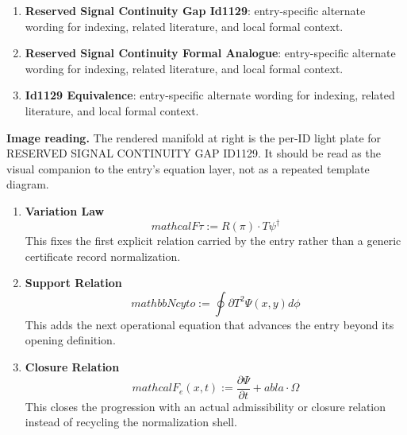 \begin{enumerate}[leftmargin=1.6em,itemsep=6pt,topsep=4pt]
\item \textbf{Reserved Signal Continuity Gap Id1129}: entry-specific alternate wording for indexing, related literature, and local formal context.
\item \textbf{Reserved Signal Continuity Formal Analogue}: entry-specific alternate wording for indexing, related literature, and local formal context.
\item \textbf{Id1129 Equivalence}: entry-specific alternate wording for indexing, related literature, and local formal context.
\end{enumerate}

\begin{samepage}
\noindent\begin{minipage}[t]{0.45\linewidth}
\vspace{0pt}
\raggedright
\scriptsize\textbf{Image reading.} The rendered manifold at right is the per-ID light plate for RESERVED SIGNAL CONTINUITY GAP ID1129. It should be read as the visual companion to the entry's equation layer, not as a repeated template diagram.\par
\end{minipage}\hfill
\begin{minipage}[t]{0.53\linewidth}
\vspace*{-0.10in}
\raggedright
{}
\end{minipage}
\end{samepage}

\clearpage


\begin{enumerate}[leftmargin=1.6em,itemsep=9pt,topsep=6pt]
\item \textbf{Variation Law}
\[
mathcal{F} {\tau}:=R(\pi)\cdot T {\psi}^{\dagger}
\]
This fixes the first explicit relation carried by the entry rather than a generic certificate record normalization.

\item \textbf{Support Relation}
\[
mathbb{N} {cyto}:=\oint {\partial T^{2}}\Psi(x,y)d\phi
\]
This adds the next operational equation that advances the entry beyond its opening definition.

\item \textbf{Closure Relation}
\[
mathcal{F}_{e}(x,t):=\frac{\partial\Psi}{\partial t}+ abla\cdot\Omega
\]
This closes the progression with an actual admissibility or closure relation instead of recycling the normalization shell.
\end{enumerate}

